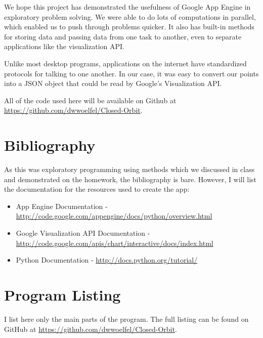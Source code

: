 \documentclass[11pt]{article}
\begin{document}
We hope this project has demonstrated the usefulness of Google App Engine in exploratory problem solving. We were able to do lots of computations in parallel, which enabled us to push through problems quicker. It also has built-in methods for storing data and passing data from one task to another, even to separate applications like the visualization API. 

Unlike most desktop programs, applications on the internet have standardized protocols for talking to one another. In our case, it was easy to convert our points into a JSON object that could be read by Google's Visualization API. 

All of the code used here will be available on Github at \url{https://github.com/dwwoelfel/Closed-Orbit}.

\section{Bibliography}

As this was exploratory programming using methods which we discussed in class and demonstrated on the homework, the bibliography is bare. However, I will list the documentation for the resources used to create the app:

\begin{itemize}
\item App Engine Documentation - \url{http://code.google.com/appengine/docs/python/overview.html}
\item Google Visualization API Documentation - \url{http://code.google.com/apis/chart/interactive/docs/index.html}
\item Python Documentation - \url{http://docs.python.org/tutorial/}
\end{itemize}

\section{Program Listing}

I list here only the main parts of the program. The full listing can be found on GitHub at \url{https://github.com/dwwoelfel/Closed-Orbit}.
\end{document}

